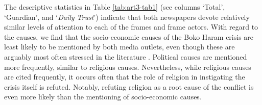 The descriptive statistics in Table \ref{tab:art3-tab1} (see columns `Total', `Guardian', and `\textit{Daily Trust}') indicate that both newspapers devote relatively similar levels of attention to each of the frames and frame actors. With regard to the causes, we find that the socio-economic causes of the Boko Haram crisis are least likely to be mentioned by both media outlets, even though these are arguably most often stressed in the literature \citep[e.g.,][]{Langer2017c, PerousedeMontclos2015, Mustapha2014b}. Political causes are mentioned more frequently, similar to religious causes. Nevertheless, while religious causes are cited frequently, it occurs often that the role of religion in instigating the crisis itself is refuted. Notably, refuting religion as a root cause of the conflict is even more likely than the mentioning of socio-economic causes. 
\newpage

